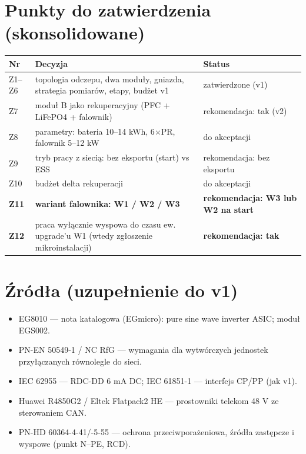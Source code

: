 \documentclass[11pt,a4paper]{article}
\begin{document}
\section{Punkty do zatwierdzenia (skonsolidowane)}
\begin{longtable}{@{}p{}p{}p{}@{}}
\toprule
\textbf{Nr} & \textbf{Decyzja} & \textbf{Status}\\
\midrule
Z1--Z6 & topologia odczepu, dwa moduły, gniazda, strategia pomiarów, etapy, budżet v1 & zatwierdzone (v1)\\
Z7 & moduł B jako rekuperacyjny (PFC + LiFePO4 + falownik) & rekomendacja: tak (v2)\\
Z8 & parametry: bateria 10--14 kWh, 6$\times$PR, falownik 5--12 kW & do akceptacji\\
Z9 & tryb pracy z siecią: bez eksportu (start) vs ESS & rekomendacja: bez eksportu\\
Z10 & budżet delta rekuperacji & do akceptacji\\
\textbf{Z11} & \textbf{wariant falownika: W1 / W2 / W3} & \textbf{rekomendacja: W3 lub W2 na start}\\
\textbf{Z12} & praca wyłącznie wyspowa do czasu ew. upgrade'u W1 (wtedy zgłoszenie mikroinstalacji) & \textbf{rekomendacja: tak}\\
\bottomrule
\end{longtable}

\section{Źródła (uzupełnienie do v1)}
\begin{itemize}\small
\item EG8010 --- nota katalogowa (EGmicro): pure sine wave inverter ASIC; moduł EGS002.
\item PN-EN 50549-1 / NC RfG --- wymagania dla wytwórczych jednostek przyłączanych równolegle do sieci.
\item IEC 62955 --- RDC-DD 6 mA DC; IEC 61851-1 --- interfejs CP/PP (jak v1).
\item Huawei R4850G2 / Eltek Flatpack2 HE --- prostowniki telekom 48 V ze sterowaniem CAN.
\item PN-HD 60364-4-41/-5-55 --- ochrona przeciwporażeniowa, źródła zastępcze i wyspowe (punkt N--PE, RCD).
\end{itemize}
\end{document}
